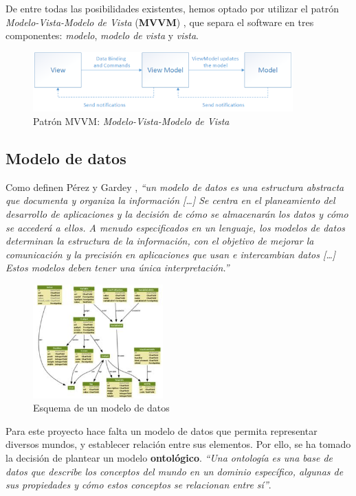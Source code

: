 De entre todas las posibilidades existentes, hemos optado por utilizar el patrón \textit{Modelo-Vista-Modelo de Vista} (\textbf{MVVM})
\autocite*{MicrosoftMVVM}, que separa el software en tres componentes: \textit{modelo}, \textit{modelo de vista} y \textit{vista}.\medskip

\begin{figure}[H]
    \centering
    \includegraphics[width=10cm]{Images/mvvm.png}
    \caption{Patrón MVVM: \textit{Modelo-Vista-Modelo de Vista} \autocite*{MicrosoftMVVM}}
\end{figure}

\subsection{Modelo de datos} \label{Modelo_Datos}
Como definen Pérez y Gardey \autocite*{Perez2017}, \textit{“un modelo de datos es una estructura abstracta que 
documenta y organiza la información [\dots] Se centra en el planeamiento del desarrollo de aplicaciones y la decisión de 
cómo se almacenarán los datos y cómo se accederá a ellos. A menudo especificados en un lenguaje, los modelos de datos 
determinan la estructura de la información, con el objetivo de mejorar la comunicación y la precisión en aplicaciones 
que usan e intercambian datos [\dots] Estos modelos deben tener una única interpretación.”} \medskip

\begin{figure}[H]
    \centering
    \includegraphics[width=5cm]{Figures/modelo_datos.jpg}
    \caption{Esquema de un modelo de datos \autocite*{Perez2017}}
\end{figure}

Para este proyecto hace falta un modelo de datos que permita representar diversos mundos, y establecer relación entre sus elementos.
Por ello, se ha tomado la decisión de plantear un modelo \textbf{ontológico}. \textit{“Una ontología es una base de datos que 
describe los conceptos del mundo en un dominio específico, algunas de sus propiedades y cómo estos conceptos se relacionan entre 
sí”}. \autocite*{Munoz2009}
 



